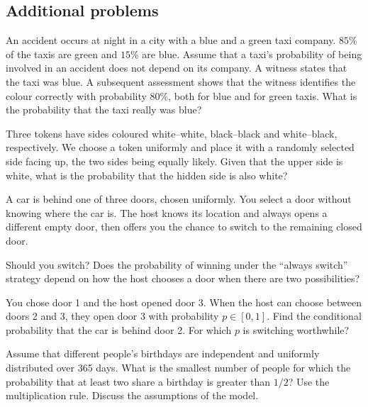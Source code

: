 \subsection*{Additional problems}
\begin{probleminteresting}
An accident occurs at night in a city with a blue and a green taxi company.
$85\%$ of the taxis are green and $15\%$ are blue. Assume that a taxi's probability
of being involved in an accident does not depend on its company.
A witness states that the taxi was blue. A subsequent assessment shows that the
witness identifies the colour correctly with probability $80\%$, both for blue
and for green taxis. What is the probability that the taxi really was blue?
\end{probleminteresting}
\begin{problem}
Three tokens have sides coloured white--white, black--black and white--black,
respectively. We choose a token uniformly and place it with a randomly selected
side facing up, the two sides being equally likely. Given that the upper side is
white, what is the probability that the hidden side is also white?
\end{problem}
\begin{probleminteresting}
A car is behind one of three doors, chosen uniformly. You select a door without
knowing where the car is. The host knows its location and always opens a different
empty door, then offers you the chance to switch to the remaining closed door.
\begin{enumeratea}
  \item Should you switch? Does the probability of winning under the ``always switch''
  strategy depend on how the host chooses a door when there are two possibilities?
  \item You chose door 1 and the host opened door 3. When the host can choose between
  doors 2 and 3, they open door 3 with probability $p\in[0,1]$.
  Find the conditional probability that the car is behind door 2. For which $p$ is switching worthwhile?
\end{enumeratea}
\end{probleminteresting}
\begin{probleminteresting}
Assume that different people's birthdays are independent and uniformly distributed
over 365 days. What is the smallest number of people for which the probability
that at least two share a birthday is greater than $1/2$? Use the multiplication
rule. Discuss the assumptions of the model.
\end{probleminteresting}
